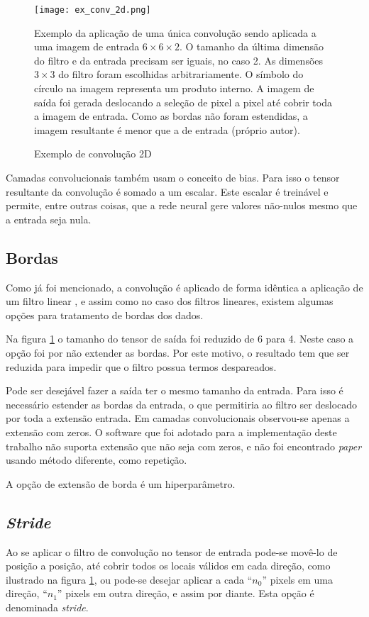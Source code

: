 \begin{figure}[!htb]
	\centering
	\texttt{[image: ex\_conv\_2d.png]}
	\caption{Exemplo de convolução 2D}
	\label{fig:ex_conv_2d}
	Exemplo da aplicação de uma única convolução sendo aplicada a uma imagem de
	entrada $6 \times 6 \times 2$. O tamanho da última dimensão do filtro e
	da entrada precisam ser iguais, no caso 2. As dimensões $3 \times 3$ do
	filtro foram escolhidas arbitrariamente. O símbolo do círculo na imagem
	representa um produto interno. A imagem de saída foi gerada deslocando
	a seleção de pixel a pixel até cobrir toda a
	imagem de entrada. Como as bordas não foram estendidas, a imagem
	resultante é menor que a de entrada (próprio autor).
\end{figure}

Camadas convolucionais também usam o conceito de bias. Para isso o tensor
resultante da convolução é somado a um escalar. Este escalar é treinável e
permite, entre outras coisas, que a rede neural gere valores não-nulos mesmo que
a entrada seja nula.

\subsection{Bordas} \label{ses:bordas}
Como já foi mencionado, a convolução é aplicado de forma idêntica a aplicação
de um filtro linear \cite{gonzalezwoods200708}, e assim como no caso dos
filtros lineares, existem algumas opções para tratamento de bordas dos dados.

Na figura \ref{fig:ex_conv_2d} o tamanho do tensor de saída foi reduzido
de 6 para 4. Neste caso a opção foi por não extender as bordas. Por
este motivo, o resultado tem que ser reduzida para impedir que o filtro
possua termos despareados.

Pode ser
desejável fazer a saída ter o mesmo tamanho da entrada. Para isso é necessário
estender as bordas da entrada, o que permitiria ao filtro ser deslocado por
toda a extensão entrada. Em camadas convolucionais observou-se apenas a
extensão com zeros. O software que foi adotado para a implementação deste
trabalho não suporta extensão que não seja com zeros, e não foi encontrado
\emph{paper} usando método diferente, como repetição.

A opção de extensão de borda é um hiperparâmetro.

\subsection{\emph{Stride}}
Ao se aplicar o filtro de convolução no tensor de entrada pode-se movê-lo de
posição a posição, até cobrir todos os locais válidos em cada direção, como
ilustrado na figura \ref{fig:ex_conv_2d}, ou pode-se desejar aplicar a cada
``$n_0$'' pixels em uma direção, ``$n_1$'' pixels em outra direção, e assim
por diante.  Esta opção é denominada \emph{stride}.


